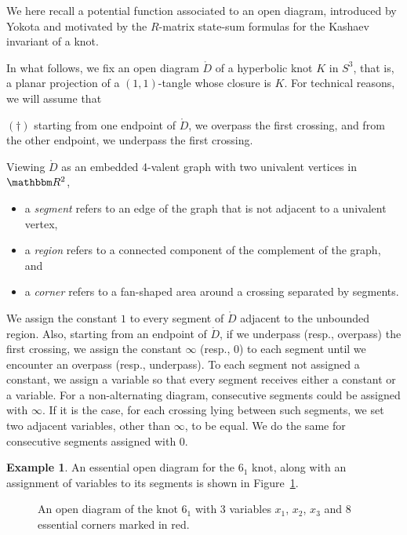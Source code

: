 \documentclass[12pt,reqno]{amsart}
\theoremstyle{definition}
\newtheorem{example}[theorem]{Example}
\def\BR{\mathbbm R}
\renewcommand{\Ddot}{\mathring{D}}
\begin{document}
We here recall a potential function associated to an open diagram, introduced by
Yokota \cite{Yokota02} and motivated by the $R$-matrix state-sum formulas for
the Kashaev invariant of a knot.

In what follows, we fix an open diagram $\Ddot$ of a hyperbolic knot $K$ in $S^3$,
that is, a planar projection of a $(1,1)$-tangle whose closure is $K$. For technical
reasons, we will assume that 
\begin{center}
$(\dagger)$
starting from one endpoint of $\Ddot$, we overpass the first crossing, and
from the other endpoint, we underpass the first crossing.
\end{center}

Viewing $\Ddot$ as an embedded 4-valent graph with two univalent vertices
in $\BR^2$, 
\begin{itemize}
\item a \emph{segment} refers to an edge of the graph that is not adjacent
to a univalent vertex,
\item a \emph{region} refers to a connected component of the complement of
the graph, and 
\item a \emph{corner} refers to a fan-shaped area around a crossing separated
by segments. 
\end{itemize}

We assign the constant $1$ to every segment of $\Ddot$ adjacent to the unbounded
region. Also, starting from an endpoint of $\Ddot$, if we underpass (resp., overpass) 
the first crossing, we assign the constant $\infty$ (resp., $0$) to each segment
until we encounter an overpass (resp., underpass). To each segment not
assigned a constant, we assign a variable so that every segment receives either
a constant or a variable. For a non-alternating diagram, consecutive segments
could be assigned with $\infty$. If it is the case, for each crossing lying
between such segments, we set two adjacent variables, other than $\infty$,
to be equal. We do the same for consecutive segments assigned with $0$. 

\begin{example}
\label{ex.61}  
An essential open diagram for the $6_1$ knot, along with an assignment
of variables to its segments is shown in Figure~\ref{fig.example}. 
\end{example}

\begin{figure}[htpb!]

\caption{An open diagram of the knot $6_1$ with 3 variables $x_1$, $x_2$,
$x_3$ and 8 essential corners marked in red.}
\label{fig.example}
\end{figure}
\end{document}
